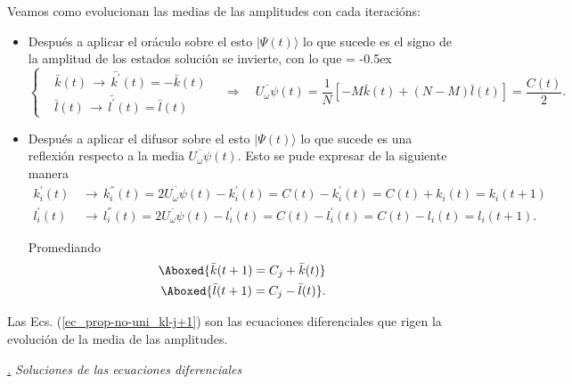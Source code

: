 \documentclass[a4paper,11pt]{book} %
\numberwithin{equation}{chapter}
\def\lc{\left[}
\def\rc{\right]}
\def\lch{\left\{}
\def\rqa{\quad \Rightarrow \quad}
\def\subsubiContadorIt{\par\addtocounter{subsubsection}{1}\underline{\it\thesubsubsection.}\hskip0.5cm \setcounter{subsubsubsectionIt}{0}}
\newcommand{\SubsubiIt}[1]{
		\subsubiContadorIt \textit{#1}
	}
\newcounter{subsubsubsectionIt}[subsubsection]
\begin{document}
Veamos como evolucionan las medias de las amplitudes con cada iteracións:
\begin{itemize}
	\item Después a aplicar el oráculo sobre el esto $|\Psi(t) \rangle$ lo que sucede es el signo de la amplitud de los estados solución se invierte, con lo que 
{
\extrarowheight = -0.5ex
\renewcommand{\arraystretch}{1.75}
\begin{equation*}
\lch \begin{matrix} 
	& \bar{k}(t) \, \rightarrow \, \bar{k^{'}}(t) = -\bar{k}(t) \\
	& \bar{l}(t) \, \rightarrow \, \bar{l^{'}}(t) = \bar{l}(t)
\end{matrix} \right.
\rqa
\overline{U_\omega \psi}(t) = \frac{1}{N} \lc - M\bar{k}(t) + (N-M) \bar{l}(t) \rc = \frac{C(t)}{2}.
\end{equation*}
}
	
	\item Después a aplicar el difusor sobre el esto $|\Psi(t) \rangle$ lo que sucede es una reflexión respecto a la media $\overline{U_\omega \psi}(t)$. Esto se pude expresar de la siguiente manera
\begin{equation} \label{ec_prop-no-uni_kl-j+1_i} 
\begin{aligned}
{k}^{'}_i(t) \, & \rightarrow \, {k}^{''}_i(t) =  2 \overline{U_\omega \psi}(t) - {k}^{'}_i(t) =  C(t) - k^{'}_i(t) = \boxed{ C(t) + k_i(t) = k_i(t+1)}   \\
{l}^{'}_i(t) \, & \rightarrow \, {l}^{''}_i(t) =  2 \overline{U_\omega \psi}(t) - {l}^{'}_i(t) = C(t) - l^{'}_i(t) = \boxed{C(t) - l_i(t) = l_i(t+1)}. 
\end{aligned}
\end{equation}

Promediando
\begin{equation} \label{ec_prop-no-uni_kl-j+1}
\begin{aligned}
\Aboxed{\bar{k}(t+1) = C_j + \bar{k}(t) }  \\
\Aboxed{\bar{l}(t+1) = C_j - \bar{l}(t)}.  
\end{aligned}
\end{equation}
\end{itemize}
Las Ecs. (\ref{ec_prop-no-uni_kl-j+1}) son las ecuaciones diferenciales que rigen la evolución de la media de las amplitudes.


\SubsubiIt{Soluciones de las ecuaciones diferenciales} 
\end{document}
